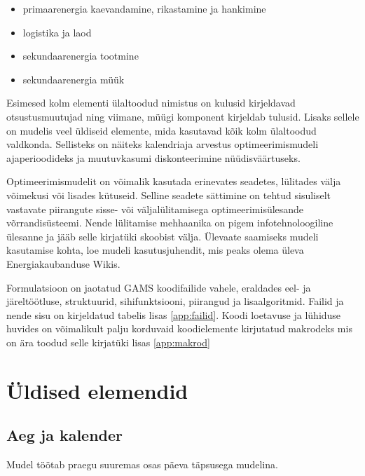 \documentclass[10pt,a4paper]{article}
\begin{document}
\begin{itemize}
\item primaarenergia kaevandamine, rikastamine ja hankimine
\item logistika ja laod
\item sekundaarenergia tootmine 
\item sekundaarenergia müük
\end{itemize}

Esimesed kolm elementi ülaltoodud nimistus on kulusid kirjeldavad otsustusmuutujad ning viimane, müügi komponent kirjeldab tulusid. Lisaks sellele on mudelis veel üldiseid elemente, mida kasutavad kõik kolm ülaltoodud valdkonda. Sellisteks on näiteks kalendriaja arvestus optimeerimismudeli ajaperioodideks ja muutuvkasumi diskonteerimine nüüdisväärtuseks.

Optimeerimismudelit on võimalik kasutada erinevates seadetes, lülitades välja võimekusi või lisades kütuseid. Selline seadete sättimine on tehtud sisuliselt vastavate piirangute sisse- või väljalülitamisega optimeerimisülesande võrrandi\-süsteemi. Nende lülitamise mehhaanika on pigem infotehnoloogiline ülesanne ja jääb selle kirjatüki skoobist välja. Ülevaate saamiseks mudeli kasutamise kohta, loe mudeli kasutusjuhendit, mis peaks olema üleva Energiakaubanduse Wikis.

Formulatsioon on jaotatud GAMS koodifailide vahele, eraldades eel- ja järel\-töötluse, struktuurid, sihifunktsiooni, piirangud ja lisaalgoritmid. Failid ja nende sisu on kirjeldatud tabelis lisas \ref{app:failid}. Koodi loetavuse ja lühiduse huvides on võimalikult palju korduvaid koodielemente kirjutatud makrodeks mis on ära toodud selle kirjatüki lisas \ref{app:makrod}

\section{Üldised elemendid}
\subsection{Aeg ja kalender}
Mudel töötab praegu suuremas osas päeva täpsusega mudelina.
\end{document}
